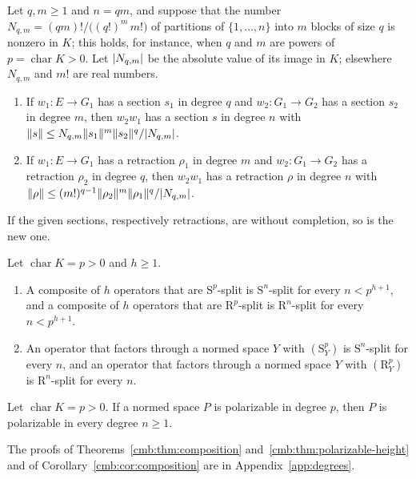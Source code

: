 \begin{theorem}[composition]\label{cmb:thm:composition}
Let $q,m\ge1$ and $n=qm$, and suppose that the number $N_{q,m}=(qm)!/\bigl((q!)^m\,m!\bigr)$ of partitions of
$\{1,\dots,n\}$ into $m$ blocks of size $q$ is nonzero in $K$; this holds, for instance, when $q$ and $m$ are powers of
$p=\operatorname{char}K>0$. Let $\lvert N_{q,m}\rvert$ be the absolute value of its image in $K$; elsewhere $N_{q,m}$ and $m!$
are real numbers.
\begin{enumerate}
\item If $w_1\colon E\to G_1$ has a section $s_1$ in degree $q$ and $w_2\colon G_1\to G_2$ has a section $s_2$ in degree
$m$, then $w_2w_1$ has a section $s$ in degree $n$ with $\lVert s\rVert\le N_{q,m}\lVert s_1\rVert^m\lVert s_2\rVert^q/\lvert N_{q,m}\rvert$.
\item If $w_1\colon E\to G_1$ has a retraction $\rho_1$ in degree $m$ and $w_2\colon G_1\to G_2$ has a retraction
$\rho_2$ in degree $q$, then $w_2w_1$ has a retraction $\rho$ in degree $n$ with
$\lVert \rho\rVert\le(m!)^{q-1}\lVert \rho_2\rVert^m\lVert \rho_1\rVert^q/\lvert N_{q,m}\rvert$.
\end{enumerate}
If the given sections, respectively retractions, are without completion, so is the new one.
\end{theorem}

\begin{corollary}\label{cmb:cor:composition}
Let $\operatorname{char}K=p>0$ and $h\ge1$.
\begin{enumerate}
\item A composite of $h$ operators that are $\mathrm S^p$-split is $\mathrm S^n$-split for every $n<p^{h+1}$, and a
composite of $h$ operators that are $\mathrm R^p$-split is $\mathrm R^n$-split for every $n<p^{h+1}$.
\item An operator that factors through a normed space $Y$ with $(\mathrm S^p_Y)$ is $\mathrm S^n$-split for every $n$,
and an operator that factors through a normed space $Y$ with $(\mathrm R^p_Y)$ is $\mathrm R^n$-split for every $n$.
\end{enumerate}
\end{corollary}

\begin{theorem}\label{cmb:thm:polarizable-height}
Let $\operatorname{char}K=p>0$. If a normed space $P$ is polarizable in degree $p$, then $P$ is polarizable in every degree
$n\ge1$.
\end{theorem}

The proofs of Theorems~\ref{cmb:thm:composition} and~\ref{cmb:thm:polarizable-height} and of
Corollary~\ref{cmb:cor:composition} are in Appendix~\ref{app:degrees}.

